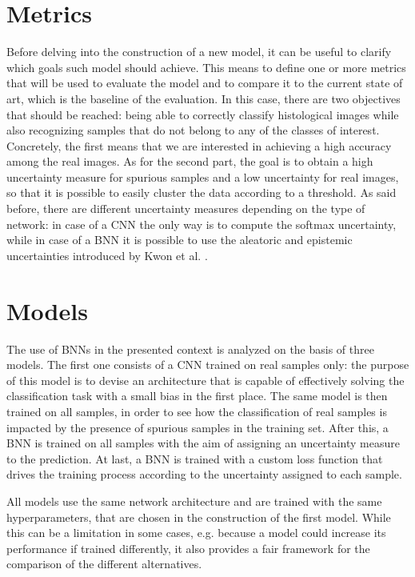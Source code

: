 \documentclass[11pt,twoside,a4paper]{article}
\begin{document}
\section{Metrics}
\label{sec:metrics}
Before delving into the construction of a new model, it can be useful to clarify which goals such model should achieve. This means to define one or more metrics that will be used to evaluate the model and to compare it to the current state of art, which is the baseline of the evaluation.\newline
In this case, there are two objectives that should be reached: being able to correctly classify histological images while also recognizing samples that do not belong to any of the classes of interest. Concretely, the first means that we are interested in achieving a high accuracy among the real images. As for the second part, the goal is to obtain a high uncertainty measure for spurious samples and a low uncertainty for real images, so that it is possible to easily cluster the data according to a threshold.\newline
As said before, there are different uncertainty measures depending on the type of network: in case of a CNN the only way is to compute the softmax uncertainty, while in case of a BNN it is possible to use the aleatoric and epistemic uncertainties introduced by Kwon et al. \cite{kwon2018uncertainty}.

\section{Models}
\label{sec:models}
The use of BNNs in the presented context is analyzed on the basis of three models. The first one consists of a CNN trained on real samples only: the purpose of this model is to devise an architecture that is capable of effectively solving the classification task with a small bias in the first place. The same model is then trained on all samples, in order to see how the classification of real samples is impacted by the presence of spurious samples in the training set. After this, a BNN is trained on all samples with the aim of assigning an uncertainty measure to the prediction. At last, a BNN is trained with a custom loss function that drives the training process according to the uncertainty assigned to each sample.

All models use the same network architecture and are trained with the same hyperparameters, that are chosen in the construction of the first model. While this can be a limitation in some cases, e.g. because a model could increase its performance if trained differently, it also provides a fair framework for the comparison of the different alternatives. 
\end{document}
